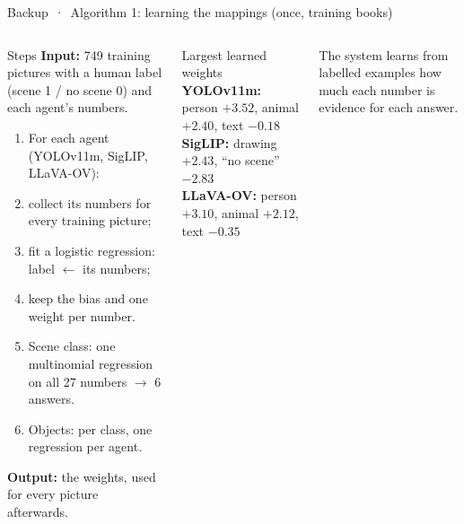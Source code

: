 \documentclass[aspectratio=169,10pt]{beamer}
\begin{document}
\begin{frame}{Backup \,·\, Algorithm 1: learning the mappings (once, training books)}
\begin{columns}[T,onlytextwidth]
\begin{defbox}{Steps}
\textbf{Input:} 749 training pictures with a human label (scene 1 / no scene 0) and each agent's numbers.
\begin{enumerate}\setlength\itemsep{2pt}
\item For each agent (YOLOv11m, SigLIP, LLaVA-OV):
\item \quad collect its numbers for every training picture;
\item \quad fit a logistic regression: label $\leftarrow$ its numbers;
\item \quad keep the bias and one weight per number.
\item Scene class: one multinomial regression on all 27 numbers $\to$ 6 answers.
\item Objects: per class, one regression per agent.
\end{enumerate}
\textbf{Output:} the weights, used for every picture afterwards.
\end{defbox}
\begin{defbox}{Largest learned weights}
\textbf{YOLOv11m:} person $+3.52$, animal $+2.40$, text $-0.18$\\[2pt]
\textbf{SigLIP:} drawing $+2.43$, ``no scene'' $-2.83$\\[2pt]
\textbf{LLaVA-OV:} person $+3.10$, animal $+2.12$, text $-0.35$
\end{defbox}\vspace{3pt}
{\footnotesize The system learns from labelled examples how much each number is evidence for each answer.}
\end{columns}
\end{frame}
\end{document}
